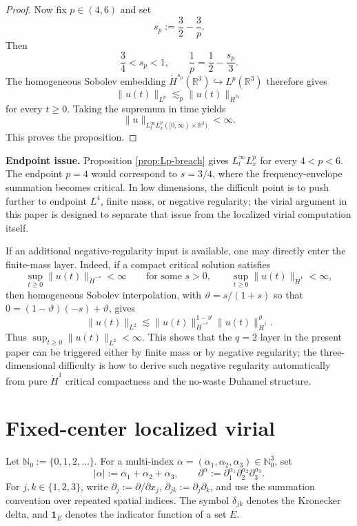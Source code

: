 \documentclass[10pt,a4paper]{amsart}
\numberwithin{equation}{section}
\newcommand{\R}{\mathbb R}
\begin{document}
\begin{proof}
Now fix $p\in(4,6)$ and set
\begin{equation*}
  s_p:=\frac32-\frac3p.
\end{equation*}
Then
\begin{equation*}
  \frac34<s_p<1,
  \qquad
  \frac1p=\frac12-\frac{s_p}{3}.
\end{equation*}
The homogeneous Sobolev embedding $\dot H^{s_p}(\R^3)\hookrightarrow L^p(\R^3)$ therefore gives
\begin{equation*}
  \|u(t)\|_{L^p}
  \lesssim_p \|u(t)\|_{\dot H^{s_p}}
\end{equation*}
for every $t\ge0$. Taking the supremum in time yields
\begin{equation*}
  \|u\|_{L_t^\infty L_x^p([0,\infty)\times\R^3)}<\infty.
\end{equation*}
This proves the proposition.
\end{proof}

\medskip
\noindent\textbf{Endpoint issue.} Proposition \ref{prop:Lp-breach} gives $L_t^\infty L_x^p$ for every $4<p<6$. The endpoint $p=4$ would correspond to $s=3/4$, where the frequency-envelope summation becomes critical. In low dimensions, the difficult point is to push further to endpoint $L^4$, finite mass, or negative regularity; the virial argument in this paper is designed to separate that issue from the localized virial computation itself.

\medskip
If an additional negative-regularity input is available, one may directly enter the finite-mass layer. Indeed, if a compact critical solution satisfies
\[
  \sup_{t\ge0}\|u(t)\|_{\dot H^{-s}}<\infty
  \qquad\text{for some }s>0,
  \qquad
  \sup_{t\ge0}\|u(t)\|_{\dot H^1}<\infty,
\]
then homogeneous Sobolev interpolation, with $\vartheta=s/(1+s)$ so that $0=(1-\vartheta)(-s)+\vartheta$, gives
\[
  \|u(t)\|_{L^2}
  \lesssim \|u(t)\|_{\dot H^{-s}}^{1-\vartheta}
           \|u(t)\|_{\dot H^1}^{\vartheta}.
\]
Thus $\sup_{t\ge0}\|u(t)\|_{L^2}<\infty$. This shows that the $q=2$ layer in the present paper can be triggered either by finite mass or by negative regularity; the three-dimensional difficulty is how to derive such negative regularity automatically from pure $\dot H^1$ critical compactness and the no-waste Duhamel structure.

\section{Fixed-center localized virial}\label{sec:virial}

Let $\mathbb N_0:=\{0,1,2,\ldots\}$. For a multi-index $\alpha=(\alpha_1,\alpha_2,\alpha_3)\in\mathbb N_0^3$, set
\begin{equation*}
  |\alpha|:=\alpha_1+\alpha_2+\alpha_3,
  \qquad
  \partial^\alpha:=\partial_1^{\alpha_1}\partial_2^{\alpha_2}\partial_3^{\alpha_3}.
\end{equation*}
For $j,k\in\{1,2,3\}$, write $\partial_j:=\partial/\partial x_j$, $\partial_{jk}:=\partial_j\partial_k$, and use the summation convention over repeated spatial indices. The symbol $\delta_{jk}$ denotes the Kronecker delta, and $\mathbf 1_E$ denotes the indicator function of a set $E$.
\end{document}
